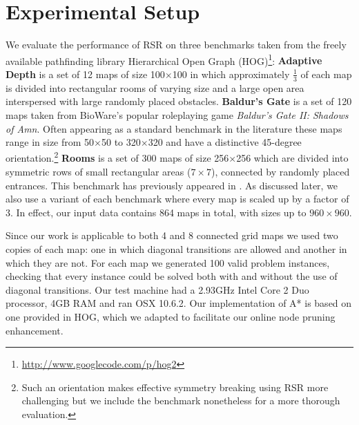 \section{Experimental Setup}
\label{cha::rsr::setup}
We evaluate the performance of RSR on three benchmarks taken from the freely
available pathfinding library Hierarchical Open Graph
(HOG)\footnote{\url{http://www.googlecode.com/p/hog2}}: {\textbf{Adaptive Depth}
is a set of 12 maps of size 100$\times$100 in which approximately $\frac{1}{3}$
of each map is divided into rectangular rooms of varying size and a large
open area interspersed with large randomly placed obstacles.} {\textbf{Baldur's
Gate} is a set of 120 maps taken from BioWare's popular roleplaying game
\emph{Baldur's Gate II: Shadows of Amn}.  Often appearing as a standard
benchmark in the literature \citep{bjornsson06,harabor10,pochter10} these maps
range in size from 50$\times$50 to 320$\times$320 and have a distinctive
45-degree orientation.\footnote{Such an orientation makes effective symmetry
breaking using RSR more challenging but we include the benchmark nonetheless
for a more thorough evaluation.}}
{\textbf{Rooms} is a set of 300 maps of size
256$\times$256 which are divided into symmetric rows of small rectangular areas
($7\times7$), connected by randomly placed entrances. This benchmark has
previously appeared in \citep{sturtevant09,pochter10,goldenberg10}.}
As discussed later, we also use a variant of each benchmark where every map is
scaled up by a factor of 3. In effect, our input data contains 864 maps in
total, with sizes up to $960\times960$.  
\par
Since our work is applicable to both 4 and 8 connected grid maps we used two
copies of each map: one in which diagonal transitions are allowed and another
in which they are not.  For each map we generated 100 valid problem instances,
checking that every instance could be solved both with and without the use of
diagonal transitions.  Our test machine had a 2.93GHz Intel Core 2 Duo
processor, 4GB RAM and ran OSX 10.6.2.  Our implementation of A* is based on
one provided in HOG, which we adapted to facilitate our online node pruning
enhancement.

